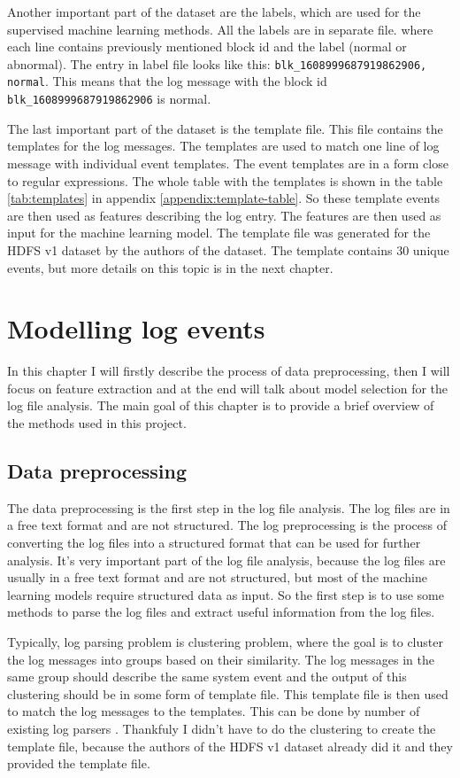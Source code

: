 Another important part of the dataset are the labels, which are used for the supervised machine learning methods. All the labels are in separate file. where each line contains previously mentioned block id and the label (normal or abnormal).
The entry in label file looks like this: \texttt{blk\_1608999687919862906, normal}. This means that the log message with the block id \texttt{blk\_1608999687919862906} is normal.

The last important part of the dataset is the template file. This file contains the templates for the log messages. The templates are used to match one line of log message with individual event templates. The event templates are in a form close to regular expressions.
The whole table with the templates is shown in the table \ref{tab:templates} in appendix \ref{appendix:template-table}. So these template events are then used as features describing the log entry. The features are then used as input for the machine learning model.
The template file was generated for the HDFS v1 dataset by the authors of the dataset. The template contains 30 unique events, but more details on this topic is in the next chapter.

\chapter{Modelling log events}
In this chapter I will firstly describe the process of data preprocessing, then I will focus on feature extraction and at the end will talk about model selection for the log file analysis. 
The main goal of this chapter is to provide a brief overview of the methods used in this project.


\section{Data preprocessing}
The data preprocessing is the first step in the log file analysis. The log files are in a free text format and are not structured. 
The log preprocessing is the process of converting the log files into a structured format that can be used for further analysis. It's very important part 
of the log file analysis, because the log files are usually in a free text format and are not structured, but most of the machine learning models require structured data as input.
So the first step is to use some methods to parse the log files and extract useful information from the log files. 

Typically, log parsing problem is clustering problem, where the goal is to cluster the log messages into groups based on their similarity. The log messages in the same group
should describe the same system event and the output of this clustering should be in some form of template file. This template file is then used to match the log messages to the templates. 
This can be done by number of existing log parsers \cite{goat}. %
Thankfuly I didn't have to do the clustering to create the template file, because the authors of the HDFS v1 dataset already did it and they provided the template file. 

